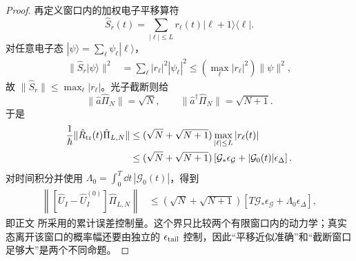 \begin{proof}
再定义窗口内的加权电子平移算符
\[
 \hat S_r(t)=\sum_{|\ell|\le L}r_\ell(t)|\ell+1\rangle\langle\ell|.
\]
对任意电子态 $|\psi\rangle=\sum_\ell\psi_\ell|\ell\rangle$，
\begin{align*}
 \|\hat S_r|\psi\rangle\|^2
 &=\sum_\ell |r_\ell|^2|\psi_\ell|^2
 \le \left(\max_\ell|r_\ell|^2\right)\|\psi\|^2,
\end{align*}
故 $\|\hat S_r\|\le\max_\ell|r_\ell|$。光子截断则给
\[
 \|\hat a\hat\Pi_N\|=\sqrt N,
 \qquad
 \|\hat a^\dagger\hat\Pi_N\|=\sqrt{N+1}.
\]
于是
\begin{align*}
 \frac1\hbar\|\hat R_{\rm tr}(t)\hat\Pi_{L,N}\|
 &\le(\sqrt N+\sqrt{N+1})\max_{|\ell|\le L}|r_\ell(t)|\\
 &\le(\sqrt N+\sqrt{N+1})
 \left[\mathcal G_*\epsilon_{\mathcal G}
 +|\mathcal G_0(t)|\epsilon_\Delta\right].
\end{align*}
对时间积分并使用
$\Lambda_0=\int_0^T\dd t\,|\mathcal G_0(t)|$，得到
\begin{align*}
 \left\|
 [\hat U_I-\hat U_I^{(0)}]\hat\Pi_{L,N}
 \right\|
 &\le(\sqrt N+\sqrt{N+1})
 \left[T\mathcal G_*\epsilon_{\mathcal G}
 +\Lambda_0\epsilon_\Delta\right],
\end{align*}
即正文 所采用的累计误差控制量。这个界只比较两个有限窗口内的动力学；真实态离开该窗口的概率幅还要由独立的 $\epsilon_{\rm tail}$ 控制，因此“平移近似准确”和“截断窗口足够大”是两个不同命题。
\end{proof}


